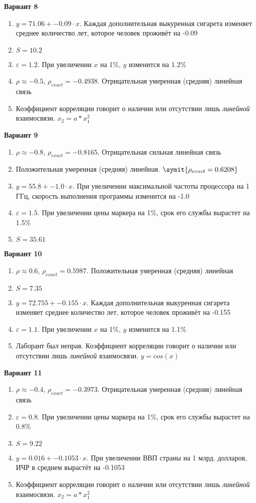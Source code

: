 \documentclass{article}
\begin{document}
\textbf{Вариант 8}
\begin{enumerate}
\item $y = 71.06+-0.09\cdot x$. Каждая дополнительная выкуренная сигарета изменяет среднее количество лет, которое человек проживёт на -0.09
\item $S = 10.2$
\item $\varepsilon = 1.2$. При увеличении $x$ на 1\%, $y$ изменится на 1.2\%
\item $\rho \approx -0.5$, $\rho_{exact} = -0.4938$. Отрицательная умеренная (средняя) линейная связь
\item Коэффициент корреляции говорит о наличии или отсутствии лишь \textit{линейной} взаимосвязи. $x_2 = a * x_1 ^ 2$  
\end{enumerate}

\textbf{Вариант 9}
\begin{enumerate}
\item $\rho \approx -0.8$, $\rho_{exact} = -0.8165$. Отрицательная сильная линейная связь
\item Положительная умеренная (средняя) линейная. $\symit{\rho_{exact} = 0.6208}$
\item $y = 55.8+-1.0\cdot x$. При увеличении максимальной частоты процессора на 1 ГГц, скорость выполнения программы изменится на -1.0
\item $\varepsilon = 1.5$. При увеличении цены маркера на 1\%, срок его службы вырастет на 1.5\%
\item $S = 35.61$
\end{enumerate}

\textbf{Вариант 10}
\begin{enumerate}
\item $\rho \approx 0.6$, $\rho_{exact} = 0.5987$. Положительная умеренная (средняя) линейная
\item $S = 7.35$
\item $y = 72.755+-0.155\cdot x$. Каждая дополнительная выкуренная сигарета изменяет среднее количество лет, которое человек проживёт на -0.155
\item $\varepsilon = 1.1$. При увеличении $x$ на 1\%, $y$ изменится на 1.1\%
\item Лаборант был неправ. Коэффициент корреляции говорит о наличии или отсутствии лишь \textit{линейной} взаимосвязи. $y = cos(x)$
\end{enumerate}

\textbf{Вариант 11}
\begin{enumerate}
\item $\rho \approx -0.4$, $\rho_{exact} = -0.3973$. Отрицательная умеренная (средняя) линейная связь
\item $\varepsilon = 0.8$. При увеличении цены маркера на 1\%, срок его службы вырастет на 0.8\%
\item $S = 9.22$
\item $y = 0.016 + -0.1053\cdot x$. При увеличении ВВП страны на 1 млрд. долларов, ИЧР в среднем вырастёт на -0.1053
\item Коэффициент корреляции говорит о наличии или отсутствии лишь \textit{линейной} взаимосвязи. $x_2 = a * x_1 ^ 2$  
\end{enumerate}
\end{document}
